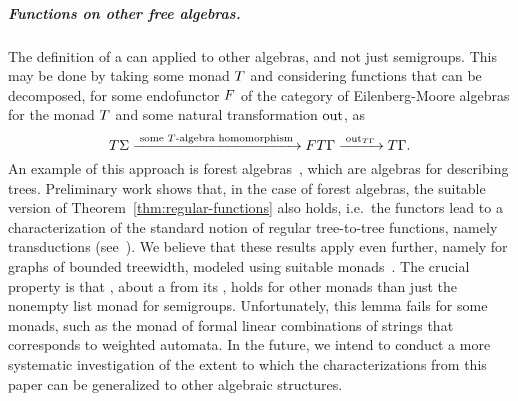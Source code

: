 \subparagraph{Functions on other free algebras.} The definition of a  can applied to other algebras, and not just semigroups. This may be
done by taking some monad $\monad$ and considering functions that can be
decomposed, for some endofunctor $\functor$ of the category of Eilenberg-Moore
algebras for the monad $\monad$ and some natural transformation $\mathrm{out}$, as
\[ \functort \Sigma \xrightarrow{\;\text{some $\functort$-algebra
      homomorphism}\;} \functor \functort \Gamma
  \xrightarrow{\;\outfun_{\functort \Gamma}\;} \functort \Gamma. \]
An example of this approach is forest algebras~\cite[Section 5]{bojanczyk_recobook}, which are algebras for describing trees. Preliminary work shows that, in the case of forest algebras, the suitable version of Theorem~\ref{thm:regular-functions} also holds, i.e.~the  functors lead to a characterization of the standard notion of regular tree-to-tree functions, namely \mso transductions (see~\cite{MacroMSO,FOTree}). We believe that these results apply even further, namely for graphs of bounded treewidth, modeled using suitable monads~\cite[Section 6]{bojanczyk_recobook}. The crucial property is that , about  a  from its , holds for other monads than just the nonempty list monad for semigroups. Unfortunately, this lemma fails for some monads, such as the monad of formal linear combinations of strings that corresponds to weighted automata. In the future, we intend to conduct a more systematic investigation of the extent to which the characterizations from this paper can be generalized to other algebraic structures.

